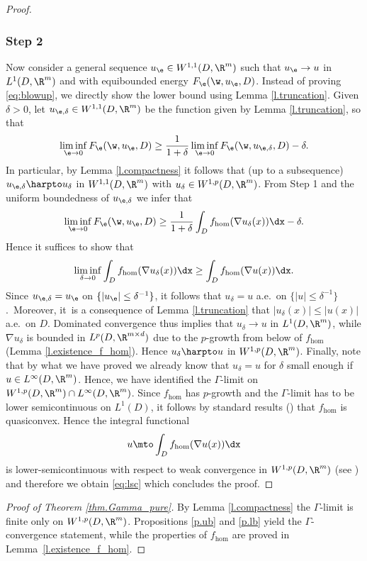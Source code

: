 \begin{proof}
\subsubsection*{Step 2} Now consider a general sequence $u_{\e}\in W^{1,1}(D,\R^m)$ such that $u_{\e}\to u$ in $L^1(D,\R^m)$ and with equibounded energy $F_{\e}(\w,u_{\e},D)$. Instead of proving \eqref{eq:blowup}, we directly show the lower bound using Lemma \ref{l.truncation}. Given $\delta>0$, let $u_{\e,\delta}\in W^{1,1}(D,\R^m)$ be the function given by Lemma \ref{l.truncation}, so that
\begin{equation*}
\liminf_{\e\to 0}F_{\e}(\w,u_{\e},D)\geq \frac{1}{1+\delta}\liminf_{\e\to 0}F_{\e}(\w,u_{\e,\delta},D)-\delta.
\end{equation*}
In particular, by Lemma \ref{l.compactness} it follows that (up to a subsequence) $u_{\e,\delta}\harpto u_{\delta}$ in $W^{1,1}(D,\R^m)$ with $u_{\delta}\in W^{1,p}(D,\R^m)$. From Step 1 and the uniform boundedness of $u_{\e,\delta}$ we infer that
\begin{equation*}
\liminf_{\e\to 0}F_{\e}(\w,u_{\e},D)\geq \frac{1}{1+\delta}\int_Df_{\hom}(\nabla u_{\delta}(x))\dx-\delta.
\end{equation*}
Hence it suffices to show that
\begin{equation}\label{eq:lsc}
\liminf_{\delta\to 0}\int_D f_{\hom}(\nabla u_{\delta}(x))\dx\geq \int_D f_{\hom}(\nabla u(x))\dx.
\end{equation}
Since $u_{\e,\delta}=u_{\e}$ on $\{|u_{\e}|\leq\delta^{-1}\}$, it follows that $u_{\delta}=u$ a.e.\ on $\{|u|\leq \delta^{-1}\}$.~Moreover, it~is a consequence of Lemma \ref{l.truncation} that $|u_{\delta}(x)|\leq |u(x)|$ a.e.\ on $D$. Dominated convergence thus implies that $u_{\delta}\to u$ in $L^1(D,\R^m)$, while $\nabla u_{\delta}$ is bounded in $L^p(D,\R^{m\times d})$ due to the $p$-growth from below of $f_{\hom}$ (\cf Lemma \ref{l.existence_f_hom}). Hence $u_{\delta}\harpto u$ in $W^{1,p}(D,\R^m)$. Finally, note that by what we have proved we already know that $u_{\delta}=u$ for $\delta$ small enough if $u\in L^{\infty}(D,\R^m)$. Hence, we have identified the $\Gamma$-limit on $W^{1,p}(D,\R^m)\cap L^{\infty}(D,\R^m)$. Since $f_{\hom}$ has $p$-growth and the $\Gamma$-limit has to be lower semicontinuous on $L^1(D)$, it follows by standard results (\cite[Th.\,8.4]{Da}) that $f_{\hom}$ is quasiconvex. Hence the integral functional
\begin{equation*}
u\mto \int_D f_{\hom}(\nabla u(x))\dx
\end{equation*}
is lower-semicontinuous with respect to weak convergence in $W^{1,p}(D,\R^m)$ (see \cite[Th.\,8.11]{Da}) and therefore we obtain \eqref{eq:lsc} which concludes the proof.
\end{proof}
\begin{proof}[Proof of Theorem \ref{thm.Gamma_pure}]
By Lemma \ref{l.compactness} the $\Gamma$-limit is finite only on $W^{1,p}(D,\R^m)$. Propositions \ref{p.ub} and \ref{p.lb} yield the $\Gamma$-convergence statement, while the properties of $f_{\hom}$ are proved in Lemma~\ref{l.existence_f_hom}.
\end{proof}
